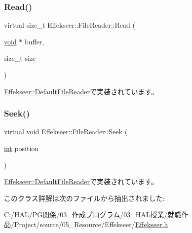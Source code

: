 \subsubsection{\texorpdfstring{Read()}{Read()}}
{\footnotesize\ttfamily virtual size\+\_\+t Effekseer\+::\+File\+Reader\+::\+Read (\begin{DoxyParamCaption}\item[{\mbox{\hyperlink{namespace_effekseer_ab34c4088e512200cf4c2716f168deb56}{void}} $\ast$}]{buffer,  }\item[{size\+\_\+t}]{size }\end{DoxyParamCaption})\hspace{0.3cm}{\ttfamily [pure virtual]}}



\mbox{\hyperlink{class_effekseer_1_1_default_file_reader_ae00fd8b1031e13bd5a43d74f03d7ed79}{Effekseer\+::\+Default\+File\+Reader}}で実装されています。

\mbox{\label{class_effekseer_1_1_file_reader_a5daeb98049f994bccf874b2374e36a25}} 
\subsubsection{\texorpdfstring{Seek()}{Seek()}}
{\footnotesize\ttfamily virtual \mbox{\hyperlink{namespace_effekseer_ab34c4088e512200cf4c2716f168deb56}{void}} Effekseer\+::\+File\+Reader\+::\+Seek (\begin{DoxyParamCaption}\item[{\mbox{\hyperlink{namespace_effekseer_ace0abf7c2e6947e519ebe8b54cbcc30a}{int}}}]{position }\end{DoxyParamCaption})\hspace{0.3cm}{\ttfamily [pure virtual]}}



\mbox{\hyperlink{class_effekseer_1_1_default_file_reader_a9c9e821e4508708a2c91a9ab486b2709}{Effekseer\+::\+Default\+File\+Reader}}で実装されています。



このクラス詳解は次のファイルから抽出されました\+:\begin{DoxyCompactItemize}
\item 
C\+:/\+H\+A\+L/\+P\+G関係/03\+\_\+作成プログラム/03\+\_\+\+H\+A\+L授業/就職作品/\+Project/source/05\+\_\+\+Resource/\+Effekseer/\mbox{\hyperlink{_effekseer_8h}{Effekseer.\+h}}\end{DoxyCompactItemize}
